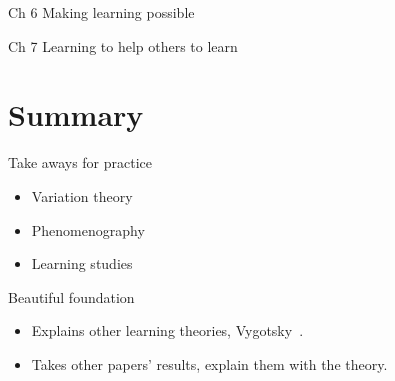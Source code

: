 \begin{frame}
  \begin{block}{Ch 6 Making learning possible}
  \end{block}
\end{frame}

\begin{frame}
\end{frame}

\begin{frame}
  \begin{block}{Ch 7 Learning to help others to learn}
  \end{block}
\end{frame}

\section{Summary}

\begin{frame}
  \begin{block}{Take aways for practice}
    \begin{itemize}
      \item Variation theory
      \item Phenomenography
      \item Learning studies
    \end{itemize}
  \end{block}

  \begin{block}{Beautiful foundation}
    \begin{itemize}
      \item Explains other learning theories, \eg Vygotsky~\cite{Vygotsky}.
      \item Takes other papers' results, explain them with the theory.
    \end{itemize}
  \end{block}
\end{frame}

